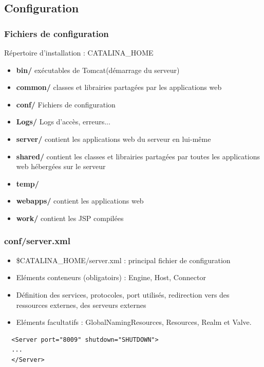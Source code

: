 \subsection{Configuration}
\begin{frame}
  \frametitle{Fichiers de configuration}

		Répertoire d'installation : CATALINA\_HOME
\begin{itemize} 
    \item \textbf{bin/} exécutables de Tomcat(démarrage du serveur)
    \item \textbf{common/} classes et librairies partagées par les applications web
    \item \textbf{conf/} Fichiers de configuration
    \item \textbf{Logs/} Logs d'accès, erreurs...
    \item \textbf{server/} contient les applications web du serveur en lui-même
    \item \textbf{shared/} contient les classes et librairies partagées par toutes les applications web hébergées sur le serveur
    \item \textbf{temp/}
    \item \textbf{webapps/} contient les applications web
    \item \textbf{work/} contient les JSP compilées
\end{itemize} 
\end{frame}


\begin{frame}
  \frametitle{conf/server.xml}

\begin{itemize}
  \item \$CATALINA\_HOME/server.xml : principal fichier de configuration
  \item Eléments conteneurs (obligatoirs) : Engine, Host, Connector
  \item Définition des services, protocoles, port utilisés, redirection vers des ressources externes, des serveurs externes
  \item Eléments facultatifs : GlobalNamingResources, Resources, Realm et Valve.
\end{itemize} 

\begin{lstlisting}
  <Server port="8009" shutdown="SHUTDOWN">
  ...
  </Server>
\end{lstlisting}
		
\end{frame}


